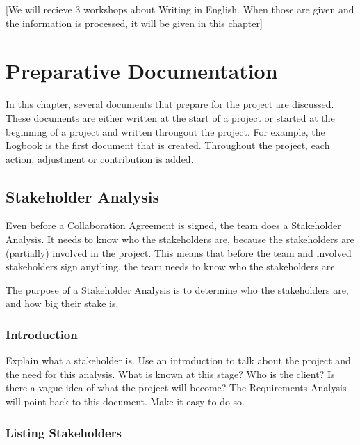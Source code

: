 \documentclass[10pt]{report}
\begin{document}
[We will recieve 3 workshops about Writing in English. When those are given and the information is processed, it will be given in this chapter] 

\newpage

\chapter{Preparative Documentation}
\thispagestyle{fancy}

In this chapter, several documents that prepare for the project are discussed. These documents are either written at the start of a project or started at the beginning of a project and written througout the project. For example, the Logbook is the first document that is created. Throughout the project, each action, adjustment or contribution is added.

\medskip
\minitoc

\newpage

\section{Stakeholder Analysis}

Even before a Collaboration Agreement is signed, the team does a Stakeholder Analysis. It needs to know who the stakeholders are, because the stakeholders are (partially) involved in the project. This means that before the team and involved stakeholders sign anything, the team needs to know who the stakeholders are.

\bigskip

The purpose of a Stakeholder Analysis is to determine who the stakeholders are, and how big their stake is.

\subsection{Introduction}

Explain what a stakeholder is. Use an introduction to talk about the project and the need for this analysis. What is known at this stage? Who is the client? Is there a vague idea of what the project will become? The Requirements Analysis will point back to this document. Make it easy to do so.

\subsection{Listing Stakeholders}
\end{document}
